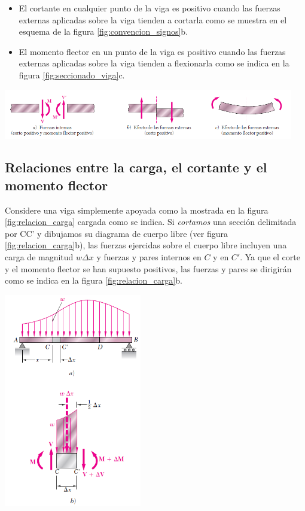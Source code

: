 \documentclass[12pt,letterpaper]{article}
\begin{document}
\begin{itemize}
\item El cortante en cualquier punto de la viga es positivo cuando las fuerzas externas aplicadas 
sobre la viga tienden a cortarla como se muestra en el esquema de la figura \ref{fig:convencion_signos}b.
\item El momento flector en un punto de la viga es positivo cuando las fuerzas externas aplicadas 
sobre la viga tienden a flexionarla como se indica en la figura \ref{fig:seccionado_viga}c.
\end{itemize}

\begin{center}
\includegraphics[width=0.95\textwidth]{img/convencion_signos.PNG}
\label{fig:convencion_signos}
\end{center}


\subsection{Relaciones entre la carga, el cortante y el momento flector}

Considere una viga simplemente apoyada como la mostrada en la figura \ref{fig:relacion_carga} cargada como se 
indica. Si \textit{cortamos} una sección delimitada por CC' y dibujamos su diagrama de cuerpo libre 
(ver figura \ref{fig:relacion_carga}b), las fuerzas ejercidas sobre el cuerpo libre incluyen una carga de magnitud 
$w \Delta x$ y fuerzas y pares internos en $C$ y en $C'$. Ya que el corte y el momento flector se han supuesto 
positivos, las fuerzas y pares se dirigirán como se indica en la figura \ref{fig:relacion_carga}b.

\begin{center}
\includegraphics[width=0.45\textwidth]{img/relacion_carga.PNG}
\label{fig:relacion_carga}
\end{center}
\end{document}
